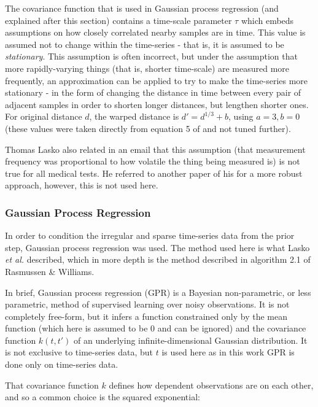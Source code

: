 \documentclass[journal]{IEEEtran}
\begin{document}
The covariance function that is used in Gaussian process regression
(and explained after this section) contains a time-scale parameter
$\tau$ which embeds assumptions on how closely correlated nearby
samples are in time.  This value is assumed not to change within the
time-series - that is, it is assumed to be
\textit{stationary}\cite{Lasko2013}.  This assumption is often
incorrect, but under the assumption that more rapidly-varying things
(that is, shorter time-scale) are measured more frequently, an
approximation can be applied to try to make the time-series more
stationary - in the form of changing the distance in time between
every pair of adjacent samples in order to shorten longer distances,
but lengthen shorter ones\cite{Lasko2013}.  For original distance $d$,
the warped distance is $d'=d^{1/3}+b$, using $a=3, b=0$ (these
values were taken directly from equation 5 of \cite{Lasko2013} and not
tuned further).

Thomas Lasko also related in an email that this assumption (that
measurement frequency was proportional to how volatile the thing being
measured is) is not true for all medical tests.  He referred to
another paper of his\cite{Lasko2015} for a more robust approach,
however, this is not used here.

\subsubsection{Gaussian Process Regression}

In order to condition the irregular and sparse time-series data from
the prior step, Gaussian process regression was used.  The method used
here is what Lasko \emph{et al.}\cite{Lasko2013} described, which in
more depth is the method described in algorithm 2.1 of Rasmussen \&
Williams\cite{Rasmussen2004}.

In brief, Gaussian process regression (GPR) is a Bayesian
non-parametric, or less parametric, method of supervised learning over
noisy observations\cite{Ebden2015,Lasko2013,Rasmussen2004}.  It is not
completely free-form, but it infers a function constrained only by the
mean function (which here is assumed to be 0 and can be ignored) and
the covariance function $k(t,t')$ of an underlying
infinite-dimensional Gaussian distribution.  It is not exclusive to
time-series data, but $t$ is used here as in this work GPR is done
only on time-series data.

That covariance function $k$ defines how dependent observations are on
each other, and so a common choice is the squared
exponential\cite{Ebden2015}:
\end{document}
